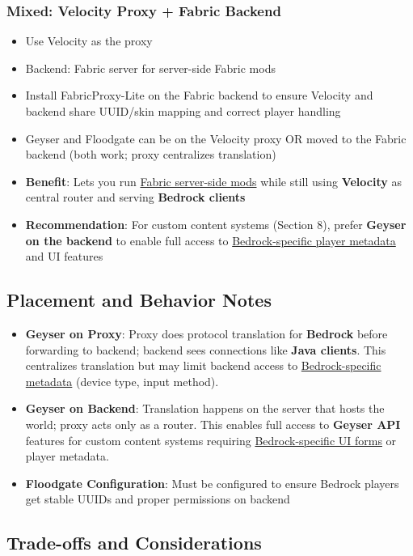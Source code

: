 \documentclass{article}
\begin{document}
\subsubsection{Mixed: Velocity Proxy + Fabric Backend}

\begin{itemize}
    \item Use Velocity as the proxy
    \item Backend: Fabric server for server-side Fabric mods
    \item Install FabricProxy-Lite on the Fabric backend to ensure Velocity and backend share UUID/skin mapping and correct player handling
    \item Geyser and Floodgate can be on the Velocity proxy OR moved to the Fabric backend (both work; proxy centralizes translation)
    \item \textbf{Benefit}: Lets you run \uline{Fabric server-side mods} while still using \textbf{Velocity} as central router and serving \textbf{Bedrock clients}
    \item \textbf{Recommendation}: For custom content systems (Section 8), prefer \textbf{Geyser on the backend} to enable full access to \uline{Bedrock-specific player metadata} and UI features
\end{itemize}

\subsection{Placement and Behavior Notes}

\begin{itemize}
    \item \textbf{Geyser on Proxy}: Proxy does protocol translation for \textbf{Bedrock} before forwarding to backend; backend sees connections like \textbf{Java clients}. This centralizes translation but may limit backend access to \uline{Bedrock-specific metadata} (device type, input method).
    \item \textbf{Geyser on Backend}: Translation happens on the server that hosts the world; proxy acts only as a router. This enables full access to \textbf{Geyser API} features for custom content systems requiring \uline{Bedrock-specific UI forms} or player metadata.
    \item \textbf{Floodgate Configuration}: Must be configured to ensure Bedrock players get stable UUIDs and proper permissions on backend
\end{itemize}

\subsection{Trade-offs and Considerations}
\end{document}
